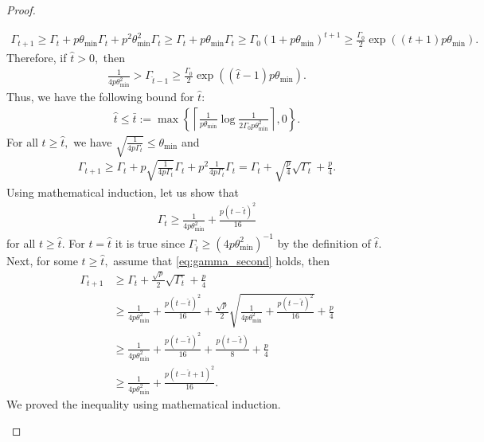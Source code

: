 \documentclass{article} %
\theoremstyle{plain}
\theoremstyle{definition}
\theoremstyle{remark}
\newcommand{\eqdef}{:=}
\begin{document}
\begin{proof}
\begin{enumerate}
\begin{align}
  \label{eq:gamma_first}
  \Gamma_{t+1} \geq \Gamma_t + p \theta_{\min} \Gamma_t + p^2 \theta_{\min}^2 \Gamma_t \geq \Gamma_t + p \theta_{\min} \Gamma_t \geq \Gamma_0 \left(1 + p \theta_{\min}\right)^{t+1} \geq \frac{\Gamma_0}{2} \exp \left((t+1) p \theta_{\min}\right).
\end{align}
Therefore, if $\widehat{t} > 0,$ then
\begin{align*}
  \frac{1}{4 p \theta_{\min}^2} > \Gamma_{\widehat{t} - 1} \geq \frac{\Gamma_0}{2} \exp \left((\widehat{t} - 1) p \theta_{\min}\right).
\end{align*}
Thus, we have the following bound for $\widehat{t}$:
\begin{align*}
  \widehat{t} \leq \bar{t} \eqdef \max\left\{\left\lceil\frac{1}{p \theta_{\min}} \log \frac{1}{2 \Gamma_0 p \theta_{\min}^2}\right\rceil, 0\right\}.
\end{align*}
For all $t \geq \widehat{t},$ we have $\sqrt{\frac{1}{4 p \Gamma_t}} \leq \theta_{\min}$ and
\begin{align*}
  \Gamma_{t+1} \geq \Gamma_t + p\sqrt{\frac{1}{4 p \Gamma_t}} \Gamma_t + p^2 \frac{1}{4 p \Gamma_t} \Gamma_t = \Gamma_t + \sqrt{\frac{p}{4}} \sqrt{\Gamma_t} + \frac{p}{4}.
\end{align*}
Using mathematical induction, let us show that 
\begin{align}
  \label{eq:gamma_second}
  \Gamma_{t} \geq \frac{1}{4 p \theta_{\min}^2} + \frac{p (t - \widehat{t})^2}{16}
\end{align} for all $t \geq \widehat{t}.$ For $t = \widehat{t}$ it is true since $\Gamma_{\widehat{t}} \geq \left(4 p \theta_{\min}^2\right)^{-1}$ by the definition of $\widehat{t}.$ Next, for some $t \geq \widehat{t},$ assume that \eqref{eq:gamma_second} holds, then 
\begin{align*}
  \Gamma_{t+1} &\geq \Gamma_t + \frac{\sqrt{p}}{2} \sqrt{\Gamma_t} + \frac{p}{4}\\
  &\geq \frac{1}{4 p \theta_{\min}^2} + \frac{p (t - \widehat{t})^2}{16} + \frac{\sqrt{p}}{2} \sqrt{\frac{1}{4 p \theta_{\min}^2} + \frac{p (t - \widehat{t})^2}{16}} + \frac{p}{4}\\
  &\geq \frac{1}{4 p \theta_{\min}^2} + \frac{p (t - \widehat{t})^2}{16} + \frac{p (t - \widehat{t})}{8} + \frac{p}{4}\\
  &\geq \frac{1}{4 p \theta_{\min}^2} + \frac{p (t - \widehat{t} + 1)^2}{16}.
\end{align*}
We proved the inequality using mathematical induction.

\end{enumerate}
\end{proof}
\end{document}
